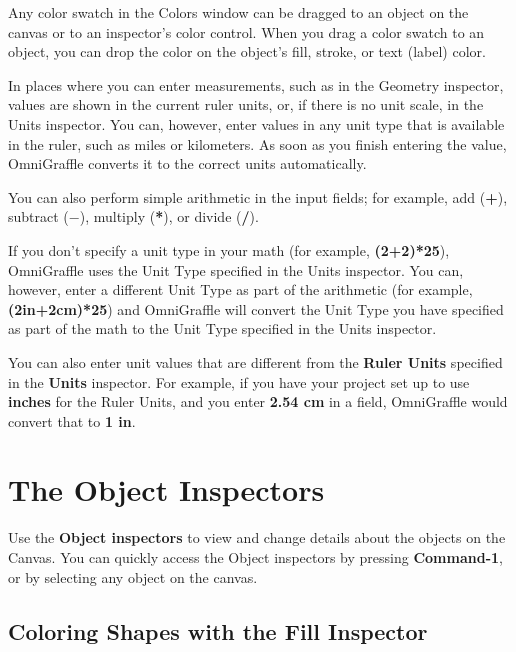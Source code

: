 \documentclass[../main.tex]{subfiles}
\begin{document}

Any color swatch in the Colors window can be dragged to an object on the canvas or to an
inspector's color control. When you drag a color swatch to an object, you can drop the color
on the object's fill, stroke, or text (label) color.


In places where you can enter measurements, such as in the Geometry inspector, values are shown
in the current ruler units, or, if there is no unit scale, in the Units inspector. You can,
however, enter values in any unit type that is available in the ruler, such as miles or
kilometers. As soon as you finish entering the value, OmniGraffle converts it to the correct
units automatically.


You can also perform simple arithmetic in the input fields; for example, add (\textbf{+}),
subtract (\textbf{$-$}), multiply (\textbf{*}), or divide (\textbf{/}).


If you don't specify a unit type in your math (for example, \textbf{(2+2)*25}), OmniGraffle uses
the Unit Type specified in the Units inspector. You can, however, enter a different Unit Type
as part of the arithmetic (for example, \textbf{(2in+2cm)*25}) and OmniGraffle will convert
the Unit Type you have specified as part of the math to the Unit Type specified in the Units
inspector.

You can also enter unit values that are different from the \textbf{Ruler Units} specified in the
\textbf{Units} inspector. For example, if you have your project set up to use \textbf{inches}
for the Ruler Units, and you enter \textbf{2.54 cm} in a field, OmniGraffle would convert that
to \textbf{1 in}.

\section{The Object Inspectors}

Use the \textbf{Object inspectors} to view and change details about the objects on the Canvas.
You can quickly access the Object inspectors by pressing \textbf{Command-1}, or by selecting
any object on the canvas.

\subsection{Coloring Shapes with the Fill Inspector}
\end{document}
